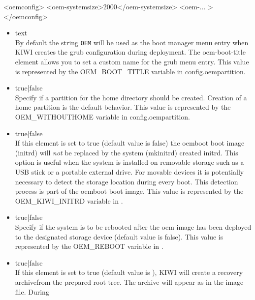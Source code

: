 \begin{itemize}
\begin{xml}
<oemconfig>
  <oem-systemsize>2000</oem-systemsize>
  <oem-... >
</oemconfig>
\end{xml}

	\begin{itemize}
    \item {}text\\
       By default the string \verb!OEM! will be used as the boot manager 
       menu entry when KIWI creates the grub configuration during
       deployment. The oem-boot-title element allows you to set a custom
       name for the grub menu entry. This value is represented by the
       OEM\_BOOT\_TITLE variable in config.oempartition.
	\item {}true|false\\
       Specify if a partition for the home directory should be created.
       Creation of a home partition is the default behavior. This value is 
       represented by the OEM\_WITHOUTHOME variable in config.oempartition.
	\item {}true|false\\
       If this element is set to true (default value is false) the oemboot 
       boot image (initrd) will \emph{not} be replaced by the system 
       (mkinitrd) created initrd. This option is useful when the system
       is installed on removable storage such as a USB stick or a portable
       external drive. For movable devices it is potentially necessary to 
       detect the storage location during every boot. This detection
       process is part of the oemboot boot image. This value is represented
       by the OEM\_KIWI\_INITRD variable in .
	\item {}true|false\\
       Specify if the system is to be rebooted after the oem image has been
       deployed to the designated storage device (default value is false). 
       This value is represented by the OEM\_REBOOT variable in 
       .
	\item {}true|false\\
      If this element is set to true (default value is ), KIWI will
      create a recovery archivefrom the prepared root tree. The archive will 
      appear as  in the image file. During 

\end{itemize}
\end{itemize}
